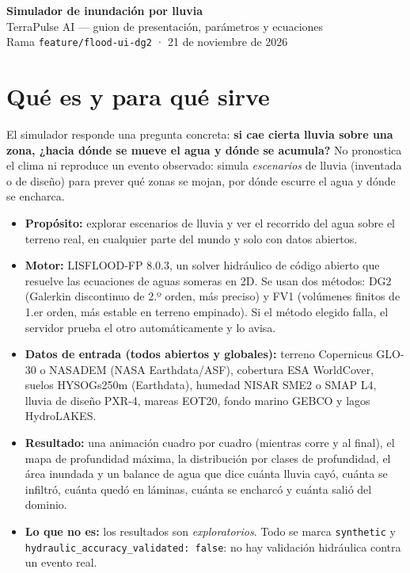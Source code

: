 \documentclass[11pt,letterpaper]{article}
\begin{document}
\begin{center}
{\LARGE\bfseries\color{agua} Simulador de inundación por lluvia}\\[4pt]
{\large TerraPulse AI — guion de presentación, parámetros y ecuaciones}\\[4pt]
{\small Rama \texttt{feature/flood-ui-dg2} · 21 de noviembre de 2026}
\end{center}

\section{Qué es y para qué sirve}

El simulador responde una pregunta concreta: \textbf{si cae cierta lluvia sobre una zona, ¿hacia dónde se mueve el agua y dónde se acumula?}
No pronostica el clima ni reproduce un evento observado: simula \emph{escenarios} de lluvia (inventada o de diseño) para prever qué zonas se mojan, por dónde escurre el agua y dónde se encharca.

\begin{itemize}
  \item \textbf{Propósito:} explorar escenarios de lluvia y ver el recorrido del agua sobre el terreno real, en cualquier parte del mundo y solo con datos abiertos.
  \item \textbf{Motor:} LISFLOOD-FP 8.0.3, un solver hidráulico de código abierto que resuelve las ecuaciones de aguas someras en 2D. Se usan dos métodos: DG2 (Galerkin discontinuo de 2.º orden, más preciso) y FV1 (volúmenes finitos de 1.er orden, más estable en terreno empinado). Si el método elegido falla, el servidor prueba el otro automáticamente y lo avisa.
  \item \textbf{Datos de entrada (todos abiertos y globales):} terreno Copernicus GLO-30 o NASADEM (NASA Earthdata/ASF), cobertura ESA WorldCover, suelos HYSOGs250m (Earthdata), humedad NISAR SME2 o SMAP L4, lluvia de diseño PXR-4, mareas EOT20, fondo marino GEBCO y lagos HydroLAKES.
  \item \textbf{Resultado:} una animación cuadro por cuadro (mientras corre y al final), el mapa de profundidad máxima, la distribución por clases de profundidad, el área inundada y un balance de agua que dice cuánta lluvia cayó, cuánta se infiltró, cuánta quedó en láminas, cuánta se encharcó y cuánta salió del dominio.
  \item \textbf{Lo que no es:} los resultados son \emph{exploratorios}. Todo se marca \texttt{synthetic} y \texttt{hydraulic\_accuracy\_\allowbreak validated:\ false}: no hay validación hidráulica contra un evento real.
\end{itemize}
\end{document}
